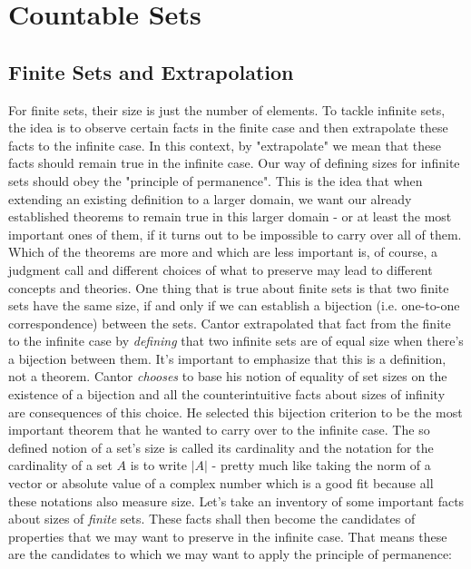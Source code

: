 \documentclass[12pt]{article}
\begin{document}


\section{Countable Sets}

\subsection{Finite Sets and Extrapolation}
For finite sets, their size is just the number of elements. To tackle infinite sets, the idea is to observe certain facts in the finite case and then extrapolate these facts to the infinite case. In this context, by "extrapolate" we mean that these facts should remain true in the infinite case. Our way of defining sizes for infinite sets should obey the "principle of permanence". This is the idea that when extending an existing definition to a larger domain, we want our already established theorems to remain true in this larger domain - or at least the most important ones of them, if it turns out to be impossible to carry over all of them. Which of the theorems are more and which are less important is, of course, a judgment call and different choices of what to preserve may lead to different concepts and theories. One thing that is true about finite sets is that two finite sets have the same size, if and only if we can establish a bijection (i.e. one-to-one correspondence) between the sets. Cantor extrapolated that fact from the finite to the infinite case by \emph{defining} that two infinite sets are of equal size when there's a bijection between them. It's important to emphasize that this is a definition, not a theorem. Cantor \emph{chooses} to base his notion of equality of set sizes on the existence of a bijection and all the counterintuitive facts about sizes of infinity are consequences of this choice. He selected this bijection criterion to be the most important theorem that he wanted to carry over to the infinite case. The so defined notion of a set's size is called its cardinality and the notation for the cardinality of a set $A$ is to write $|A|$ - pretty much like taking the norm of a vector or absolute value of a complex number which is a good fit because all these notations also measure size. Let's take an inventory of some important facts about sizes of \emph{finite} sets. These facts shall then become the candidates of properties that we may want to preserve in the infinite case. That means these are the candidates to which we may want to apply the principle of permanence:
\end{document}
